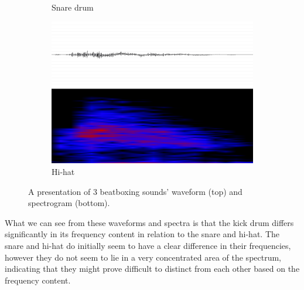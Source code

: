 \begin{figure}[h]
\begin{subfigure}[b]{0.275\textwidth}
		\caption{Snare drum}
		\label{fig:snare-wave}
	\end{subfigure}
	\begin{subfigure}[b]{0.35\textwidth}
		\includegraphics[width=\textwidth]{fig/Hihat-wave.png}
		\caption{Hi-hat}
		\label{fig:hihat-wave}
	\end{subfigure}
	\caption{A presentation of 3 beatboxing sounds' waveform (top) and spectrogram
	\label{fig:chosen-sounds} (bottom).}
\end{figure}

What we can see from these waveforms and spectra is that the kick drum differs significantly in its frequency content in relation to the snare and hi-hat. The snare and hi-hat do initially seem to have a clear difference in their frequencies, however they do not seem to lie in a very concentrated area of the spectrum, indicating that they might prove difficult to distinct from each other based on the frequency content.